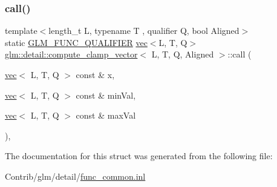 \subsubsection{\texorpdfstring{call()}{call()}}
{\footnotesize\ttfamily template$<$length\+\_\+t L, typename T , qualifier Q, bool Aligned$>$ \\
static \mbox{\hyperlink{setup_8hpp_a33fdea6f91c5f834105f7415e2a64407}{G\+L\+M\+\_\+\+F\+U\+N\+C\+\_\+\+Q\+U\+A\+L\+I\+F\+I\+ER}} \mbox{\hyperlink{structglm_1_1vec}{vec}}$<$L, T, Q$>$ \mbox{\hyperlink{structglm_1_1detail_1_1compute__clamp__vector}{glm\+::detail\+::compute\+\_\+clamp\+\_\+vector}}$<$ L, T, Q, Aligned $>$\+::call (\begin{DoxyParamCaption}\item[{\mbox{\hyperlink{structglm_1_1vec}{vec}}$<$ L, T, Q $>$ const \&}]{x,  }\item[{\mbox{\hyperlink{structglm_1_1vec}{vec}}$<$ L, T, Q $>$ const \&}]{min\+Val,  }\item[{\mbox{\hyperlink{structglm_1_1vec}{vec}}$<$ L, T, Q $>$ const \&}]{max\+Val }\end{DoxyParamCaption})\hspace{0.3cm}{\ttfamily [inline]}, {\ttfamily [static]}}



The documentation for this struct was generated from the following file\+:\begin{DoxyCompactItemize}
\item 
Contrib/glm/detail/\mbox{\hyperlink{func__common_8inl}{func\+\_\+common.\+inl}}\end{DoxyCompactItemize}
